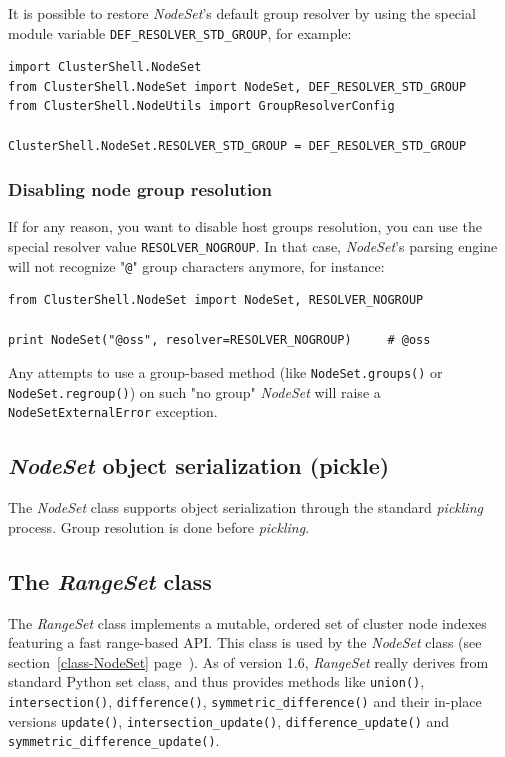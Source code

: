 \documentclass[english,a4paper]{csuserguide}
\newcommand{\NodeSet}{\textit{NodeSet}\xspace}
\newcommand{\RangeSet}{\textit{RangeSet}\xspace}
\begin{document}
It is possible to restore \NodeSet's default group resolver by using the special module variable \lstinline+DEF_RESOLVER_STD_GROUP+, for example:
\medskip
\begin{lstlisting}[breaklines=true, breakatwhitespace=true]
import ClusterShell.NodeSet
from ClusterShell.NodeSet import NodeSet, DEF_RESOLVER_STD_GROUP
from ClusterShell.NodeUtils import GroupResolverConfig

ClusterShell.NodeSet.RESOLVER_STD_GROUP = DEF_RESOLVER_STD_GROUP
\end{lstlisting}

\subsubsection{Disabling node group resolution}
\label{class-NodeSet-disable-group}

If for any reason, you want to disable host groups resolution, you can use the special resolver value \lstinline+RESOLVER_NOGROUP+. In that case, \NodeSet's parsing engine will not recognize "\verb+@+" group characters anymore, for instance:
\medskip
\begin{lstlisting}[breaklines=true, breakatwhitespace=true]
from ClusterShell.NodeSet import NodeSet, RESOLVER_NOGROUP

print NodeSet("@oss", resolver=RESOLVER_NOGROUP)     # @oss
\end{lstlisting}

Any attempts to use a group-based method (like \lstinline+NodeSet.groups()+ or \lstinline+NodeSet.regroup()+) on such "no group" \NodeSet will raise a \texttt{NodeSetExternalError} exception.


\subsection{\NodeSet object serialization (pickle)}

The \NodeSet class supports object serialization through the standard \textit{pickling} process. Group resolution is done before \textit{pickling}.


\subsection{The \RangeSet class}
\label{class-RangeSet}

The \RangeSet class implements a mutable, ordered set of cluster node indexes featuring a fast range-based API. This class is used by the \NodeSet class (see section~\ref{class-NodeSet} page~\pageref{class-NodeSet}). As of version 1.6, \RangeSet really derives from standard Python set class, and thus provides methods like \lstinline+union()+, \lstinline+intersection()+, \lstinline+difference()+, \lstinline+symmetric_difference()+ and their in-place versions \lstinline+update()+, \lstinline+intersection_update()+, \lstinline+difference_update()+ and \lstinline+symmetric_difference_update()+.
\end{document}
